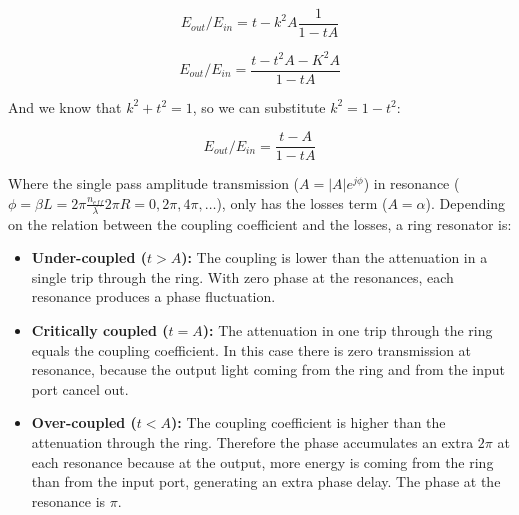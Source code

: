 \begin{equation}
	E_{out}/E_{in}=t-k^2A\frac{1}{1-tA}
\end{equation} 

\begin{equation}
	E_{out}/E_{in}=\frac{t-t^2A-K^2A}{1-tA}
\end{equation} 

And we know that $k^2+t^2=1$, so we can substitute $k^2=1-t^2$:

\begin{equation}
	E_{out}/E_{in}=\frac{t-A}{1-tA}
\label{eq:transmissionRing}
\end{equation}

Where the single pass amplitude transmission ($A=|A| e^{j\phi}$) in resonance ($\phi=\beta L=2\pi \frac{ n_{eff}}{\lambda} 2 \pi R= 0,2\pi,4\pi,\ldots$), only has the losses term ($A=\alpha$).
Depending on the relation between the coupling coefficient and the losses, a ring resonator is:

\begin{itemize}
\item \textbf{Under-coupled ($t>A$):}  The coupling is lower than the attenuation in a single trip through the ring. With zero phase at the resonances, each resonance produces a phase fluctuation. 

\item \textbf{Critically coupled ($t=A$):} The attenuation in one trip through the ring equals the coupling coefficient. In this case there is zero transmission at resonance, because the output light coming from the ring and from the input port cancel out.
 
\item \textbf{Over-coupled ($t<A$):} The coupling coefficient is higher than the attenuation through the ring. Therefore the phase accumulates an extra $2\pi$ at each resonance because at the output, more energy is coming from the ring than from the input port, generating an extra phase delay. The phase at the resonance is $\pi$.
\end{itemize}




